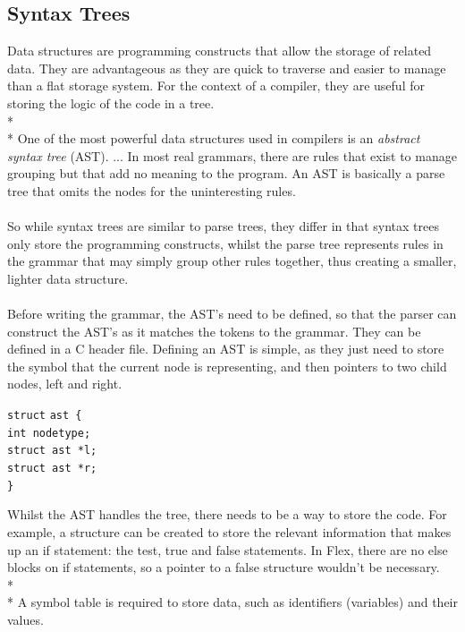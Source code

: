 \documentclass[12pt]{report}
\begin{document}
\subsection{Syntax Trees}\label{subsec:syntax_trees}
Data structures are programming constructs that allow the storage of related data.  They are advantageous as they are quick to traverse and easier to manage than a flat storage system.  For the context of a compiler, they are useful for storing the logic of the code in a tree.\\*
\\*
One of the most powerful data structures used in compilers is an \textit{abstract syntax tree} (AST). ... In most real grammars, there are rules that exist to manage grouping but that add no meaning to the program.  An AST is basically a parse tree that omits the nodes for the uninteresting rules. \citep{flexandbison09}\\
\\
So while syntax trees are similar to parse trees, they differ in that syntax trees only store the programming constructs, whilst the parse tree represents rules in the grammar that may simply group other rules together, thus creating a smaller, lighter data structure.\\
\\
Before writing the grammar, the AST's need to be defined, so that the parser can construct the AST's as it matches the tokens to the grammar.  They can be defined in a C header file.  Defining an AST is simple, as they just need to store the symbol that the current node is representing, and then pointers to two child nodes, left and right.\\
\begin{tabbing}
	\texttt{struct} \= \texttt{ast \{}\\
	\> \texttt{int nodetype;}\\
	\> \texttt{struct ast *l;}\\
	\> \texttt{struct ast *r;}\\
	\texttt{\}}
\end{tabbing}
Whilst the AST handles the tree, there needs to be a way to store the code.  For example, a structure can be created to store the relevant information that makes up an if statement: the test, true and false statements.  In Flex, there are no else blocks on if statements, so a pointer to a false structure wouldn't be necessary.\\*
\\*
A symbol table is required to store data, such as identifiers (variables) and their values.
\end{document}
